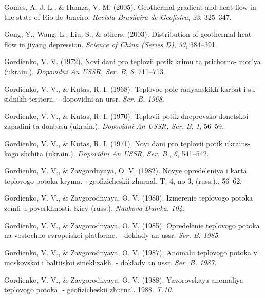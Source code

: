 \documentclass[draft,linenumbers]{agujournal2018}
\begin{document}
\leavevmode{}%
Gomes, A. J. L., \& Hamza, V. M. (2005). Geothermal gradient and heat
flow in the state of {Rio de Janeiro}. \emph{Revista Brasileira de
Geofisica}, \emph{23}, 325--347.

\leavevmode{}%
Gong, Y., Wang, L., Liu, S., \& others. (2003). Distribution of
geothermal heat flow in jiyang depression. \emph{Science of China
(Series D)}, \emph{33}, 384--391.

\leavevmode{}%
Gordienko, V. V. (1972). Novi dani pro teplovii potik krimu ta
prichorno- mor'ya (ukrain.). \emph{Dopovidni An USSR, Ser. B}, \emph{8},
711--713.

\leavevmode{}%
Gordienko, V. V., \& Kutas, R. I. (1968). Teplovoe pole radyanskikh
karpat i su- sidnikh teritorii. - dopovidni an ursr. \emph{Ser. B.
1968}.

\leavevmode{}%
Gordienko, V. V., \& Kutas, R. I. (1970). Teplovii potik
dneprovsko-donetskoi zapadini ta donbasu (ukrain.). \emph{Dopovidni An
USSR, Ser. B}, \emph{1}, 56--59.

\leavevmode{}%
Gordienko, V. V., \& Kutas, R. I. (1971). Novi dani pro teplovii potik
ukrains- kogo shchita (ukrain.). \emph{Dopovidni An USSR, Ser. B.},
\emph{6}, 541--542.

\leavevmode{}%
Gordienko, V. V., \& Zavgordnyaya, O. V. (1982). Novye opredeleniya i
karta teplovogo potoka kryma. - geofizicheskii zhurnal. T. 4, no 3,
(russ.)., 56--62.

\leavevmode{}%
Gordienko, V. V., \& Zavgorodnyaya, O. V. (1980). Izmerenie teplovogo
potoka zemli u poverkhnosti. Kiev (russ.). \emph{Naukova Dumka},
\emph{104}.

\leavevmode{}%
Gordienko, V. V., \& Zavgorodnyaya, O. V. (1985). Opredelenie teplovogo
potoka na vostochno-evropeiskoi platforme. - doklady an ussr. \emph{Ser.
B. 1985}.

\leavevmode{}%
Gordienko, V. V., \& Zavgorodnyaya, O. V. (1987). Anomalii teplovogo
potoka v moskovskoi i baltiiskoi sineklizakh. - doklady an ussr.
\emph{Ser. B. 1987}.

\leavevmode{}%
Gordienko, V. V., \& Zavgorodnyaya, O. V. (1988). Yavorovskaya anomaliya
teplovogo potoka. - geofizicheskii zhurnal. 1988. \emph{T.10}.
\end{document}
